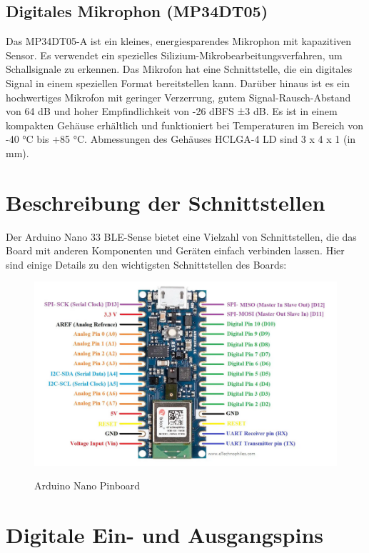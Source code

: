\subsection{Digitales Mikrophon (MP34DT05)}
	Das MP34DT05-A ist ein kleines, energiesparendes Mikrophon mit kapazitiven Sensor. Es verwendet ein spezielles Silizium-Mikrobearbeitungsverfahren, um Schallsignale zu erkennen. Das Mikrofon hat eine Schnittstelle, die ein digitales Signal in einem speziellen Format bereitstellen kann. Darüber hinaus ist es ein hochwertiges Mikrofon mit geringer Verzerrung, gutem Signal-Rausch-Abstand von 64 dB und hoher Empfindlichkeit von -26 dBFS ±3 dB. Es ist in einem kompakten Gehäuse erhältlich und funktioniert bei Temperaturen im Bereich von -40 °C bis +85 °C. Abmessungen des Gehäuses HCLGA-4 LD sind 3 x 4 x 1 (in mm).\cite{StmicElec.2021}

\section{Beschreibung der Schnittstellen}
Der Arduino Nano 33 BLE-Sense bietet eine Vielzahl von Schnittstellen, die das Board mit anderen Komponenten und Geräten einfach verbinden lassen. Hier sind einige Details zu den wichtigsten Schnittstellen des Boards:
\bigskip
\begin{figure}[htb]
	\includegraphics[width=14cm]{General/ArduinoPinBoard.png}
	\caption{Arduino Nano Pinboard} \label{Arduino Nano Pinbout}\begin{center}
		\cite{Arduino2023}
	\end{center}
\end{figure}

\section{Digitale Ein- und Ausgangspins}

